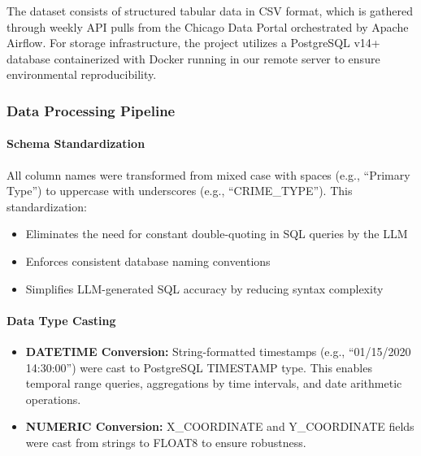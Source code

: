 \documentclass{article}
\begin{document}
The dataset consists of structured tabular data in CSV format, which is gathered through weekly API pulls from the Chicago Data Portal orchestrated by Apache Airflow. For storage infrastructure, the project utilizes a PostgreSQL v14+ database containerized with Docker running in our remote server to ensure environmental reproducibility.

\subsubsection{Data Processing Pipeline}

\paragraph{Schema Standardization}
All column names were transformed from mixed case with spaces (e.g., ``Primary Type'') to uppercase with underscores (e.g., ``CRIME\_TYPE''). This standardization:

\begin{itemize}
  \item Eliminates the need for constant double-quoting in SQL queries by the LLM
  \item Enforces consistent database naming conventions
  \item Simplifies LLM-generated SQL accuracy by reducing syntax complexity
\end{itemize}

\paragraph{Data Type Casting}
\begin{itemize}
  \item \textbf{DATETIME Conversion:} String-formatted timestamps (e.g., ``01/15/2020 14:30:00'') were cast to PostgreSQL TIMESTAMP type. This enables temporal range queries, aggregations by time intervals, and date arithmetic operations.
  \item \textbf{NUMERIC Conversion:} X\_COORDINATE and Y\_COORDINATE fields were cast from strings to FLOAT8 to ensure robustness.
\end{itemize}
\end{document}
